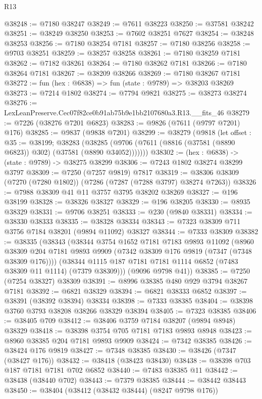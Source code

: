 \begin{lexlean}{R13}
\begin{coremodule}
@38248 := @7180 @38247
@38249 := @7611 @38223
@38250 := @37581 @38242
@38251 := @38249 @38250
@38253 := @7602 @38251 @7627
@38254 := @38248 @38253
@38256 := @7180 @38254 @7181
@38257 := @7180 @38256
@38258 := @9703 @38251
@38259 := @38257 @38258
@38261 := @7180 @38259 @7181
@38262 := @7182 @38261
@38264 := @7180 @38262 @7181
@38266 := @7180 @38264 @7181
@38267 := @38209 @38266
@38269 := @7180 @38267 @7181
@38272 := fun (hex : @6838) => fun (state : @9789) => @38203 @38269
@38273 := @7214 @1802
@38274 := @7794 @9821
@38275 := @38273 @38274
@38276 := LexLeanPreserve.Cec07f82ce0b91ab75b9e1bb2107680a3.R13.__fits_46
@38279 := @7226 (@38276 @7201 @6823)
@38283 := @9826 (@7611 (@9797 @7201) @176)
@38285 := @9837 (@9838 @7201)
@38299 := @38279
    (@9818
      (let offset : @35 := @38199;
      @38283 (@38285 (@9706 (@7611 (@8816 (@37581 (@8890 @6823)) @302) (@37581 (@8890 @34052)))))))
@38302 := (hex : @6838) -> (state : @9789) -> @38275 @38299
@38306 := @7243 @1802 @38274 @38299 @3797
@38309 := @7250 (@7257 @9819) @7817
@38319 := @38306 @38309 (@7270 (@7280 @1802)) (@7286 (@7287 (@7288 @3797) @38274 @7263))
@38326 := @7988 @38309 @41 @11 @3757 @3795 @38202 @38269
@38327 := @196 @38199
@38328 := @38326 @38327
@38329 := @196 @38205
@38330 := @8935 @38329
@38331 := @9706 @38251
@38333 := @230 (@9840 @38331)
@38334 := @38330 @38333
@38335 := @38328 @38334
@38343 := @7323 @38309 @711 @3756 @7184 @38201 (@9894 @11092) @38327
@38344 := @7333 @38309
@38382 := @38335
    (@38343
      (@38344
        @3754
        @1652
        @7181
        @7183
        @9893
        @11092
        (@8960 @38309 @204 @7181 @9893 @9909 (@7342 @38309 @176 @9819 (@7347 (@7348 @38309 @176))))
        (@38344 @1115 @187 @7181 @7181 @1114 @6852 (@7483 @38309 @11 @1114) (@7379 @38309)))
      (@9096 @9798 @41))
@38385 := @7250 (@7254 @38327) @38309
@38391 := @8996 @38385 @480 @929 @3794 @38267 @7181
@38392 := @6821 @38329
@38394 := @6821 @38333 @6852
@38397 := @38391 (@38392 @38394) @38334
@38398 := @7333 @38385
@38404 := @38398 @3760 @3793 @38208 @38266 @38329 @38394
@38405 := @7323 @38385
@38406 := @38405 @709
@38412 := @38406 @3759 @7184 @38207 (@9894 @8948) @38329
@38418 := @38398 @3754 @705 @7181 @7183 @9893 @8948
@38423 := @8960 @38385 @204 @7181 @9893 @9909
@38424 := @7342 @38385
@38426 := @38424 @176 @9819
@38427 := @7348 @38385
@38430 := @38426 (@7347 (@38427 @176))
@38432 := @38418 (@38423 @38430)
@38438 := @38398 @703 @187 @7181 @7181 @702 @6852
@38440 := @7483 @38385 @11
@38442 := @38438 (@38440 @702)
@38443 := @7379 @38385
@38444 := @38442 @38443
@38450 := @38404 (@38412 (@38432 @38444) (@8247 @9798 @176))

\end{coremodule}
\end{lexlean}
